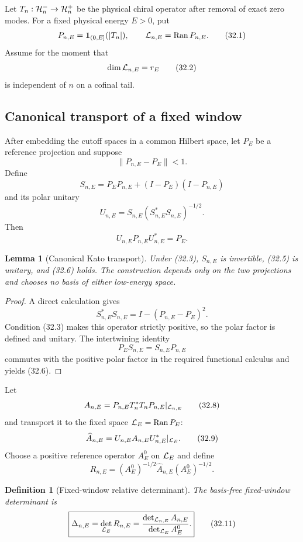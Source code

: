 \documentclass[11pt]{article}
\newtheorem{lemma}[theorem]{Lemma}
\newtheorem{definition}[theorem]{Definition}
\theoremstyle{remark}
\begin{document}
Let \(T_n:{\cal H}_n^-\to{\cal H}_n^+\) be the physical chiral
operator after removal of exact zero modes.  For a fixed physical
energy \(E>0\), put
\[
 P_{n,E}={\bf 1}_{(0,E]}(|T_n|),\qquad
 {\cal L}_{n,E}=\operatorname{Ran}P_{n,E}.                 \tag{32.1}
\]
Assume for the moment that
\[
 \dim{\cal L}_{n,E}=r_E                                   \tag{32.2}
\]
is independent of \(n\) on a cofinal tail.

\subsection{Canonical transport of a fixed window}

After embedding the cutoff spaces in a common Hilbert space, let
\(P_E\) be a reference projection and suppose
\[
 \|P_{n,E}-P_E\|<1.                                       \tag{32.3}
\]
Define
\[
 S_{n,E}
 =
 P_EP_{n,E}+(I-P_E)(I-P_{n,E})                             \tag{32.4}
\]
and its polar unitary
\[
 U_{n,E}
 =
 S_{n,E}(S_{n,E}^*S_{n,E})^{-1/2}.                        \tag{32.5}
\]
Then
\[
 U_{n,E}P_{n,E}U_{n,E}^*=P_E.                             \tag{32.6}
\]

\begin{lemma}[Canonical Kato transport]
\label{lem:v15v32-kato}
Under (32.3), \(S_{n,E}\) is invertible, (32.5) is unitary, and
(32.6) holds.  The construction depends only on the two
projections and chooses no basis of either low-energy space.
\end{lemma}

\begin{proof}
A direct calculation gives
\[
 S_{n,E}^*S_{n,E}
 =
 I-(P_{n,E}-P_E)^2.                                       \tag{32.7}
\]
Condition (32.3) makes this operator strictly positive, so the polar
factor is defined and unitary.  The intertwining identity
\[
 P_ES_{n,E}=S_{n,E}P_{n,E}
\]
commutes with the positive polar factor in the required functional
calculus and yields (32.6).
\end{proof}

Let
\[
 A_{n,E}
 =
 P_{n,E}T_n^*T_nP_{n,E}|_{{\cal L}_{n,E}}                 \tag{32.8}
\]
and transport it to the fixed space
\({\cal L}_E=\operatorname{Ran}P_E\):
\[
 \widehat A_{n,E}
 =
 U_{n,E}A_{n,E}U_{n,E}^*|_{{\cal L}_E}.                   \tag{32.9}
\]
Choose a positive reference operator \(A_E^0\) on \({\cal L}_E\)
and define
\[
 R_{n,E}
 =
 (A_E^0)^{-1/2}\widehat A_{n,E}(A_E^0)^{-1/2}.             \tag{32.10}
\]

\begin{definition}[Fixed-window relative determinant]
\label{def:v15v32-relative}
The basis-free fixed-window determinant is
\[
 \boxed{
 \Delta_{n,E}
 =
 \det_{{\cal L}_E}R_{n,E}
 =
 \frac{\det_{{\cal L}_{n,E}}A_{n,E}}
      {\det_{{\cal L}_E}A_E^0}.}                           \tag{32.11}
\]
\end{definition}
\end{document}

